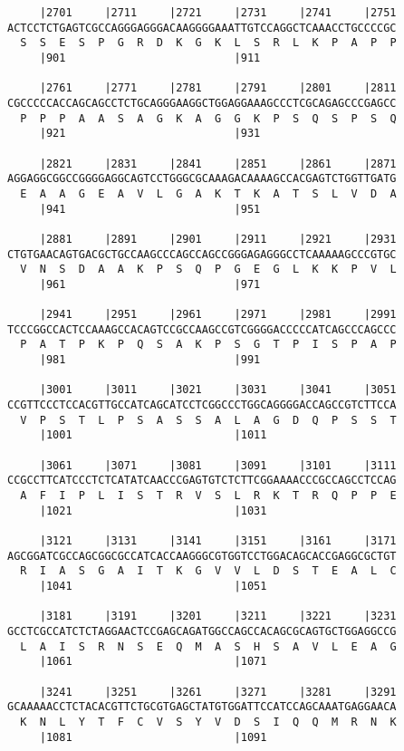 \documentclass{article}
\begin{document}
\begin{Verbatim}
     |2701     |2711     |2721     |2731     |2741     |2751
ACTCCTCTGAGTCGCCAGGGAGGGACAAGGGGAAATTGTCCAGGCTCAAACCTGCCCCGC
  S  S  E  S  P  G  R  D  K  G  K  L  S  R  L  K  P  A  P  P
     |901                          |911                     
  
     |2761     |2771     |2781     |2791     |2801     |2811
CGCCCCCACCAGCAGCCTCTGCAGGGAAGGCTGGAGGAAAGCCCTCGCAGAGCCCGAGCC
  P  P  P  A  A  S  A  G  K  A  G  G  K  P  S  Q  S  P  S  Q
     |921                          |931                     
  
     |2821     |2831     |2841     |2851     |2861     |2871
AGGAGGCGGCCGGGGAGGCAGTCCTGGGCGCAAAGACAAAAGCCACGAGTCTGGTTGATG
  E  A  A  G  E  A  V  L  G  A  K  T  K  A  T  S  L  V  D  A
     |941                          |951                     
  
     |2881     |2891     |2901     |2911     |2921     |2931
CTGTGAACAGTGACGCTGCCAAGCCCAGCCAGCCGGGAGAGGGCCTCAAAAAGCCCGTGC
  V  N  S  D  A  A  K  P  S  Q  P  G  E  G  L  K  K  P  V  L
     |961                          |971                     
  
     |2941     |2951     |2961     |2971     |2981     |2991
TCCCGGCCACTCCAAAGCCACAGTCCGCCAAGCCGTCGGGGACCCCCATCAGCCCAGCCC
  P  A  T  P  K  P  Q  S  A  K  P  S  G  T  P  I  S  P  A  P
     |981                          |991                     
  
     |3001     |3011     |3021     |3031     |3041     |3051
CCGTTCCCTCCACGTTGCCATCAGCATCCTCGGCCCTGGCAGGGGACCAGCCGTCTTCCA
  V  P  S  T  L  P  S  A  S  S  A  L  A  G  D  Q  P  S  S  T
     |1001                         |1011                    
  
     |3061     |3071     |3081     |3091     |3101     |3111
CCGCCTTCATCCCTCTCATATCAACCCGAGTGTCTCTTCGGAAAACCCGCCAGCCTCCAG
  A  F  I  P  L  I  S  T  R  V  S  L  R  K  T  R  Q  P  P  E
     |1021                         |1031                    
  
     |3121     |3131     |3141     |3151     |3161     |3171
AGCGGATCGCCAGCGGCGCCATCACCAAGGGCGTGGTCCTGGACAGCACCGAGGCGCTGT
  R  I  A  S  G  A  I  T  K  G  V  V  L  D  S  T  E  A  L  C
     |1041                         |1051                    
  
     |3181     |3191     |3201     |3211     |3221     |3231
GCCTCGCCATCTCTAGGAACTCCGAGCAGATGGCCAGCCACAGCGCAGTGCTGGAGGCCG
  L  A  I  S  R  N  S  E  Q  M  A  S  H  S  A  V  L  E  A  G
     |1061                         |1071                    
  
     |3241     |3251     |3261     |3271     |3281     |3291
GCAAAAACCTCTACACGTTCTGCGTGAGCTATGTGGATTCCATCCAGCAAATGAGGAACA
  K  N  L  Y  T  F  C  V  S  Y  V  D  S  I  Q  Q  M  R  N  K
     |1081                         |1091                    
  

\end{Verbatim}
\end{document}
